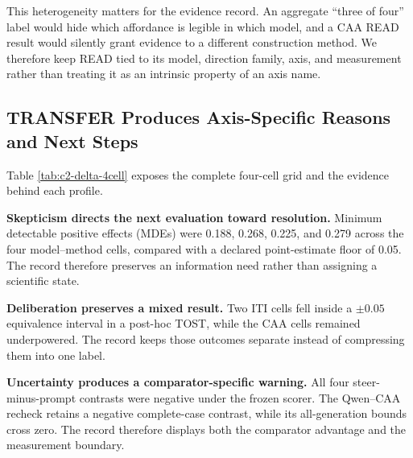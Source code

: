 \documentclass[manuscript,review,anonymous]{acmart}
\begin{document}
This heterogeneity matters for the evidence record. An aggregate ``three of four'' label would hide which affordance is legible in which model, and a CAA READ result would silently grant evidence to a different construction method. We therefore keep READ tied to its model, direction family, axis, and measurement rather than treating it as an intrinsic property of an axis name. {}%

\subsection{TRANSFER Produces Axis-Specific Reasons and Next Steps}\label{transfer-produces-axis-specific-reasons-and-next-steps}



Table \ref{tab:c2-delta-4cell} exposes the complete four-cell grid and the evidence behind each profile.

\textbf{Skepticism directs the next evaluation toward resolution.} Minimum detectable positive effects (MDEs) were 0.188, 0.268, 0.225, and 0.279 across the four model--method cells, compared with a declared point-estimate floor of 0.05. {}%
{}%
The record therefore preserves an information need rather than assigning a scientific state.

\textbf{Deliberation preserves a mixed result.} Two ITI cells fell inside a \(\pm0.05\) equivalence interval in a post-hoc TOST, while the CAA cells remained underpowered. {}%
{}%
{}%
The record keeps those outcomes separate instead of compressing them into one label.

\textbf{Uncertainty produces a comparator-specific warning.} All four steer-minus-prompt contrasts were negative under the frozen scorer. The Qwen--CAA recheck retains a negative complete-case contrast, while its all-generation bounds cross zero. {}%
{}%
The record therefore displays both the comparator advantage and the measurement boundary.
\end{document}
